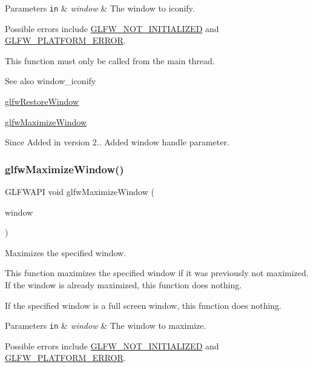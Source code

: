 \begin{DoxyParams}[1]{Parameters}
\mbox{\tt in}  & {\em window} & The window to iconify.\\
\hline
\end{DoxyParams}
Possible errors include \hyperlink{group__errors_ga2374ee02c177f12e1fa76ff3ed15e14a}{G\+L\+F\+W\+\_\+\+N\+O\+T\+\_\+\+I\+N\+I\+T\+I\+A\+L\+I\+Z\+ED} and \hyperlink{group__errors_gad44162d78100ea5e87cdd38426b8c7a1}{G\+L\+F\+W\+\_\+\+P\+L\+A\+T\+F\+O\+R\+M\+\_\+\+E\+R\+R\+OR}.

This function must only be called from the main thread.

\begin{DoxySeeAlso}{See also}
window\+\_\+iconify 

\hyperlink{group__window_ga1e29caf0b819f578b04db52fff17256c}{glfw\+Restore\+Window} 

\hyperlink{group__window_ga4f825a55367d3fabde3d06e7f30128e8}{glfw\+Maximize\+Window}
\end{DoxySeeAlso}
\begin{DoxySince}{Since}
Added in version 2..  Added window handle parameter. 
\end{DoxySince}
\mbox{\label{group__window_ga4f825a55367d3fabde3d06e7f30128e8}} 
\subsubsection{\texorpdfstring{glfw\+Maximize\+Window()}{glfwMaximizeWindow()}}
{\footnotesize\ttfamily G\+L\+F\+W\+A\+PI void glfw\+Maximize\+Window (\begin{DoxyParamCaption}\item[{\hyperlink{group__window_ga3c96d80d363e67d13a41b5d1821f3242}{G\+L\+F\+Wwindow} $\ast$}]{window }\end{DoxyParamCaption})}



Maximizes the specified window. 

This function maximizes the specified window if it was previously not maximized. If the window is already maximized, this function does nothing.

If the specified window is a full screen window, this function does nothing.


\begin{DoxyParams}[1]{Parameters}
\mbox{\tt in}  & {\em window} & The window to maximize.\\
\hline
\end{DoxyParams}
Possible errors include \hyperlink{group__errors_ga2374ee02c177f12e1fa76ff3ed15e14a}{G\+L\+F\+W\+\_\+\+N\+O\+T\+\_\+\+I\+N\+I\+T\+I\+A\+L\+I\+Z\+ED} and \hyperlink{group__errors_gad44162d78100ea5e87cdd38426b8c7a1}{G\+L\+F\+W\+\_\+\+P\+L\+A\+T\+F\+O\+R\+M\+\_\+\+E\+R\+R\+OR}.

